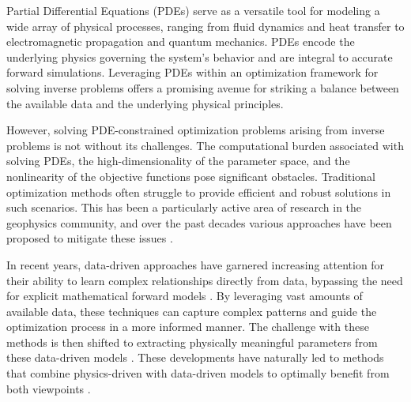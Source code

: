 \documentclass[12pt]{amsart}
\begin{document}
Partial Differential Equations (PDEs) serve as a versatile tool for modeling a wide array of physical processes, ranging from fluid dynamics and heat transfer to electromagnetic propagation and quantum mechanics. PDEs encode the underlying physics governing the system's behavior and are integral to accurate forward simulations. Leveraging PDEs within an optimization framework for solving inverse problems offers a promising avenue for striking a balance between the available data and the underlying physical principles. 

However, solving PDE-constrained optimization problems arising from inverse problems is not without its challenges. The computational burden associated with solving PDEs, the high-dimensionality of the parameter space, and the nonlinearity of the objective functions pose significant obstacles. Traditional optimization methods often struggle to provide efficient and robust solutions in such scenarios. This has been a particularly active area of research in the geophysics community, and over the past decades various approaches have been proposed to mitigate these issues \cite{virieux09,Symes2014,van2015penalty,yang2018application,Symes2020, Engquist_2022,Lin2023}.

In recent years, data-driven approaches have garnered increasing attention for their ability to learn complex relationships directly from data, bypassing the need for explicit mathematical forward models \cite{Brunton2019,deng2022openfwi,NIO2023}. By leveraging vast amounts of available data, these techniques can capture complex patterns and guide the optimization process in a more informed manner. The challenge with these methods is then shifted to extracting physically meaningful parameters from these data-driven models \cite{Borcea2018, Borcea2020}. These developments have naturally led to methods that combine physics-driven with data-driven models to optimally benefit from both viewpoints \cite{Ghattas2021,mula2023inverse,VanLeeuwen2023}.
\end{document}
